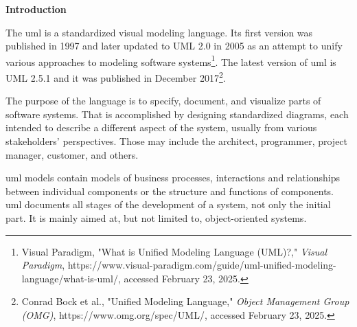 
\textbf{Introduction}

The \ac{uml} is a standardized visual modeling language. Its first version was published in 1997 and later updated to UML 2.0 in 2005 as an attempt to unify various approaches to modeling software systems\footnote{Visual Paradigm, "What is Unified Modeling Language (UML)?," \textit{Visual Paradigm}, https://www.visual-paradigm.com/guide/uml-unified-modeling-language/what-is-uml/, accessed February 23, 2025.}. The latest version of \ac{uml} is UML 2.5.1 and it was published in December 2017\footnote{Conrad Bock et al., "Unified Modeling Language," \textit{Object Management Group (OMG)}, https://www.omg.org/spec/UML/, accessed February 23, 2025.}.

The purpose of the language is to specify, document, and visualize parts of software systems. That is accomplished by designing standardized diagrams, each intended to describe a different aspect of the system, usually from various stakeholders' perspectives. Those may include the architect, programmer, project manager, customer, and others.

\ac{uml} models contain models of business processes, interactions and relationships between individual components or the structure and functions of components. \ac{uml} documents all stages of the development of a system, not only the initial part. It is mainly aimed at, but not limited to, object-oriented systems.

